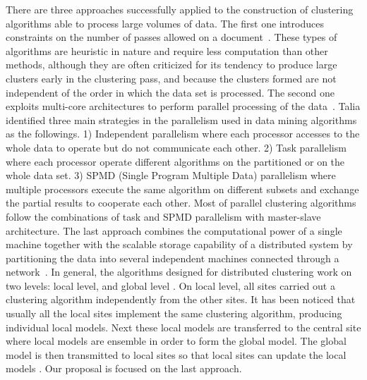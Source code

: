 \documentclass[preprint,12pt,authoryear,review]{elsarticle}
\begin{document}
There are three approaches successfully applied to the construction of clustering algorithms able to process large volumes of data. The first one introduces constraints on the number of passes allowed on a document~\cite{Yi14}. These types of algorithms are heuristic in nature and require less computation than other methods, although they are often criticized for its tendency to produce large clusters early in the clustering pass, and because the clusters formed are not independent of the order in which the data set is processed. The second one exploits multi-core architectures to perform parallel processing of the data~\cite{ZW13}. Talia \cite{Tal02} identified three main strategies in the parallelism used in data mining algorithms as the followings. 1) Independent parallelism where each processor accesses to the whole data to operate but do not communicate each other. 2) Task parallelism where each processor operate different algorithms on the partitioned or on the whole data set. 3) SPMD (Single Program Multiple Data) parallelism where multiple processors execute the same algorithm on different subsets and exchange the partial results to cooperate each other. Most of parallel clustering algorithms follow the combinations of task and SPMD parallelism with master-slave architecture. The last approach combines the computational power of a single machine together with the scalable storage capability of a distributed system by partitioning the data into several independent machines connected through a network~\cite{SC16}. In  general,  the  algorithms  designed  for  distributed  
clustering  work  on  two levels:  local level, and global level \cite{KLM03,Vis08,XJK99}. On local level, all sites  carried  out  a  clustering  algorithm  independently from the other sites. It has been noticed that usually all the local sites implement the same clustering algorithm, producing individual local models. Next these local models are transferred to the central site where local models are ensemble in order to form the global model. The global model is then transmitted to local sites so that local sites can update the local models \cite{XJK99}. Our proposal is focused on the last approach. 
\end{document}
